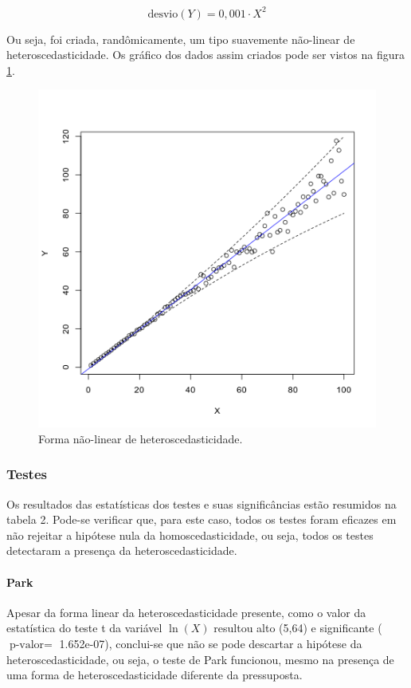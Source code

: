 \documentclass[a4paper, 12pt]{article}
\let\oldparagraph\paragraph
\renewcommand{\paragraph}[1]{\oldparagraph{#1}\mbox{}}
\begin{document}
\[\mathrm{desvio}(Y) = 0,001 \cdot X^2\]

Ou seja, foi criada, randômicamente, um tipo suavemente não-linear de
heteroscedasticidade. Os gráfico dos dados assim criados pode ser vistos
na figura \ref{fig:hetero2}.

\begin{figure}[H]

{\centering \includegraphics[width=0.6\linewidth]{images/hetero2-1} 

}

\caption{Forma não-linear de heteroscedasticidade.}\label{fig:hetero2}
\end{figure}

\hypertarget{testes-1}{%
\subsubsection{Testes}\label{testes-1}}

Os resultados das estatísticas dos testes e suas significâncias estão
resumidos na tabela 2. Pode-se verificar que, para este caso, todos os
testes foram eficazes em não rejeitar a hipótese nula da
homoscedasticidade, ou seja, todos os testes detectaram a presença da
heteroscedasticidade.

\hypertarget{park-1}{%
\paragraph{Park}\label{park-1}}

Apesar da forma linear da heteroscedasticidade presente, como o valor da
estatística do teste t da variável \(\ln(X)\) resultou alto (5,64) e
significante (\(\text{p-valor} =\) 1.652e-07), conclui-se que não se
pode descartar a hipótese da heteroscedasticidade, ou seja, o teste de
Park funcionou, mesmo na presença de uma forma de heteroscedasticidade
diferente da pressuposta.
\end{document}
